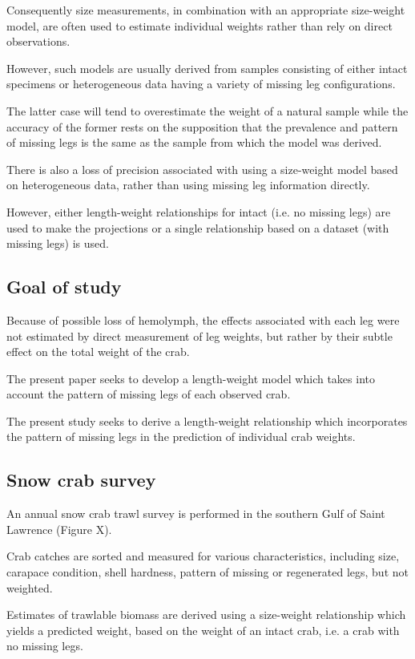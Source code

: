 \documentclass[letterpaper, 10pt]{article}
\begin{document}
Consequently size measurements, in combination with an appropriate size-weight model, are often used to estimate individual weights rather than rely on direct observations.

However, such models are usually derived from samples consisting of either intact specimens or heterogeneous data having a variety of missing leg configurations.

The latter case will tend to overestimate the weight of a natural sample while the accuracy of the former rests on the supposition that the prevalence and pattern of missing legs is the same as the sample from which the model was derived. 

There is also a loss of precision associated with using a size-weight model based on heterogeneous data, rather than using missing leg information directly.

However, either length-weight relationships for intact (i.e. no missing legs) are used to make the projections or a single relationship based on a  dataset (with missing legs) is used.

\subsection{Goal of study}
Because of possible loss of hemolymph, the effects associated with each leg were not estimated by direct measurement of leg weights, but rather by their subtle effect on the total weight of the crab.

The present paper seeks to develop a length-weight model which takes into account the pattern of missing legs of each observed crab.

The present study seeks to derive a length-weight relationship which incorporates the pattern of missing legs in the prediction of individual crab weights.

\subsection{Snow crab survey}
An annual snow crab trawl survey is performed in the southern Gulf of Saint Lawrence (Figure X). 

Crab catches are sorted and measured for various characteristics, including size, carapace condition, shell hardness, pattern of missing or regenerated legs, but not weighted.

Estimates of trawlable biomass are derived using a size-weight relationship which yields a predicted weight, based on the weight of an intact crab, i.e. a crab with no missing legs.
\end{document}
